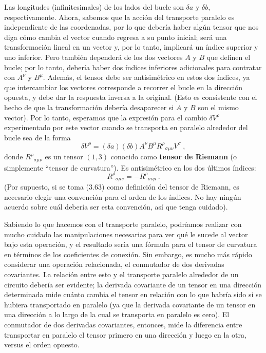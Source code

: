 \documentclass[11pt,b5paper,openany,twoside]{book}
\begin{document}
\noindent
Las longitudes (infinitesimales) de los lados del bucle son $\delta a$ y $\delta b$, respectivamente.
Ahora, sabemos que la acción del transporte paralelo es independiente de las coordenadas, por lo que debería haber algún tensor que nos diga cómo cambia el vector cuando regresa a su punto inicial; será una transformación lineal en un vector y, por lo tanto, implicará un índice superior y uno inferior.
Pero también dependerá de los dos vectores $A$ y $B$ que definen el bucle; por lo tanto, debería haber dos índices inferiores adicionales para contratar con $A^\nu$ y $B^\mu$.
Además, el tensor debe ser antisimétrico en estos dos índices, ya que intercambiar los vectores corresponde a recorrer el bucle en la dirección opuesta, y debe dar la respuesta inversa a la original.
(Esto es consistente con el hecho de que la transformación debería desaparecer si $A$ y $B$ son el mismo vector).
Por lo tanto, esperamos que la expresión para el cambio $\delta V^\rho$ experimentado por este vector cuando se transporta en paralelo alrededor del bucle sea de la forma
\begin{equation}
\delta V^\rho = (\delta a) (\delta b) A^\nu B^\mu
R^\rho{}_{\sigma \mu\nu} V^\sigma\ ,\label{3.63}
\end{equation}
donde $R^\rho{}_{\sigma \mu\nu}$ es un tensor $(1,3)$ conocido como {\bf tensor de Riemann} (o simplemente ``tensor de curvatura'').
Es antisimétrico en los dos últimos índices:
\begin{equation}
R^\rho{}_{\sigma \mu\nu}=-R^\rho{}_{\sigma \nu\mu}\,.\label{3.64}
\end{equation}
(Por supuesto, si se toma (3.63) como definición del tensor de Riemann, es necesario elegir una convención para el orden de los índices.
No hay ningún acuerdo sobre cuál debería ser esta convención, así que tenga cuidado).

Sabiendo lo que hacemos con el transporte paralelo, podríamos realizar con mucho cuidado las manipulaciones necesarias para ver qué le sucede al vector bajo esta operación, y el resultado sería una fórmula para el tensor de curvatura en términos de los coeficientes de conexión.
Sin embargo, es mucho más rápido considerar una operación relacionada, el conmutador de dos derivadas covariantes.
La relación entre esto y el transporte paralelo alrededor de un circuito debería ser evidente; la derivada covariante de un tensor en una dirección determinada mide cuánto cambia el tensor en relación con lo que habría sido si se hubiera transportado en paralelo (ya que la derivada covariante de un tensor en una dirección a lo largo de la cual se transporta en paralelo es cero).
El conmutador de dos derivadas covariantes, entonces, mide la diferencia entre transportar en paralelo el tensor primero en una dirección y luego en la otra, versus el orden opuesto.
\end{document}
